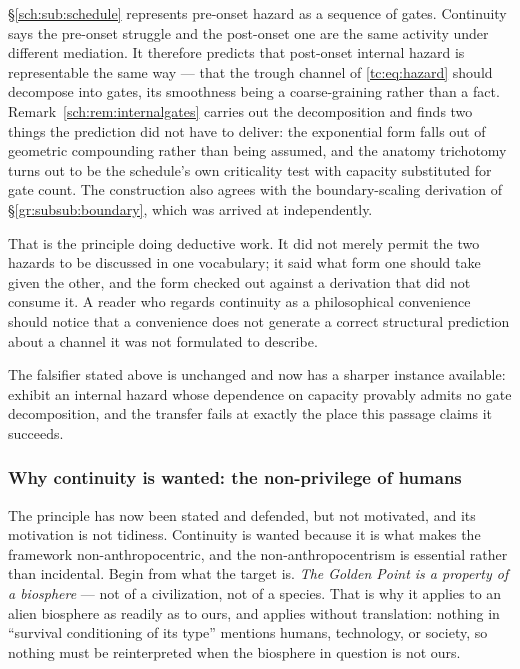 \documentclass[11pt]{article}
\numberwithin{equation}{section}
\theoremstyle{plain}
\theoremstyle{definition}
\theoremstyle{remark}
\begin{document}
\S\ref{sch:sub:schedule} represents pre-onset hazard as a sequence of
gates. Continuity says the pre-onset struggle and the post-onset one are
the same activity under different mediation. It therefore predicts that
post-onset internal hazard is representable the same way --- that the
trough channel of \eqref{tc:eq:hazard} should decompose into gates, its
smoothness being a coarse-graining rather than a fact.
Remark~\ref{sch:rem:internalgates} carries out the decomposition and
finds two things the prediction did not have to deliver: the exponential
form falls out of geometric compounding rather than being assumed, and
the anatomy trichotomy turns out to be the schedule's own criticality
test with capacity substituted for gate count. The construction also
agrees with the boundary-scaling derivation of
\S\ref{gr:subsub:boundary}, which was arrived at independently.

That is the principle doing deductive work. It did not merely permit the
two hazards to be discussed in one vocabulary; it said what form one
should take given the other, and the form checked out against a
derivation that did not consume it. A reader who regards continuity as a
philosophical convenience should notice that a convenience does not
generate a correct structural prediction about a channel it was not
formulated to describe.

The falsifier stated above is unchanged and now has a sharper instance
available: exhibit an internal hazard whose dependence on capacity
provably admits no gate decomposition, and the transfer fails at exactly
the place this passage claims it succeeds.

\subsubsection{Why continuity is wanted: the non-privilege of humans}
\label{gc:subsub:nonprivilege}

The principle has now been stated and defended, but not motivated, and
its motivation is not tidiness. Continuity is wanted because it is what
makes the framework non-anthropocentric, and the non-anthropocentrism is essential rather than incidental. Begin from what the target is. \emph{The Golden Point is a property of a
biosphere} --- not of a civilization, not of a species. That is why it
applies to an alien biosphere as readily as to ours, and applies without
translation: nothing in ``survival conditioning of its type'' mentions
humans, technology, or society, so nothing must be reinterpreted when
the biosphere in question is not ours.
\end{document}
